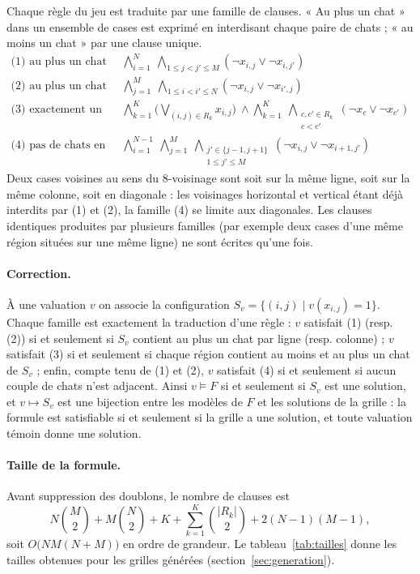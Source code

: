 \documentclass[11pt,a4paper]{article}
\newcommand{\x}[2]{x_{#1,#2}}
\begin{document}
Chaque règle du jeu est traduite par une famille de clauses. « Au plus un chat » dans un ensemble
de cases est exprimé en interdisant chaque paire de chats ; « au moins un chat » par une clause
unique.
\begin{align*}
\text{(1) au plus un chat par ligne :}\quad
  & \bigwedge_{i=1}^{N}\ \bigwedge_{1\le j<j'\le M} (\neg\x ij\vee\neg\x i{j'})\\
\text{(2) au plus un chat par colonne :}\quad
  & \bigwedge_{j=1}^{M}\ \bigwedge_{1\le i<i'\le N} (\neg\x ij\vee\neg\x {i'}j)\\
\text{(3) exactement un chat par région :}\quad
  & \bigwedge_{k=1}^{K}\Big(\bigvee_{(i,j)\in R_k}\x ij\Big)\ \wedge
    \bigwedge_{k=1}^{K}\ \bigwedge_{\substack{c,c'\in R_k\\ c<c'}} (\neg x_c\vee\neg x_{c'})\\
\text{(4) pas de chats en diagonale :}\quad
  & \bigwedge_{i=1}^{N-1}\ \bigwedge_{j=1}^{M}\ \bigwedge_{\substack{j'\in\{j-1,j+1\}\\1\le j'\le M}}
    (\neg\x ij\vee\neg\x{i+1}{j'})
\end{align*}
Deux cases voisines au sens du 8-voisinage sont soit sur la même ligne, soit sur la même colonne,
soit en diagonale : les voisinages horizontal et vertical étant déjà interdits par (1) et (2),
la famille (4) se limite aux diagonales. Les clauses identiques produites par plusieurs familles
(par exemple deux cases d'une même région situées sur une même ligne) ne sont écrites qu'une fois.

\paragraph{Correction.} À une valuation $v$ on associe la configuration
$S_v=\{(i,j)\mid v(\x ij)=1\}$. Chaque famille est exactement la traduction d'une règle :
$v$ satisfait (1) (resp. (2)) si et seulement si $S_v$ contient au plus un chat par ligne
(resp. colonne) ; $v$ satisfait (3) si et seulement si chaque région contient au moins et au plus
un chat de $S_v$ ; enfin, compte tenu de (1) et (2), $v$ satisfait (4) si et seulement si aucun
couple de chats n'est adjacent. Ainsi $v\models F$ si et seulement si $S_v$ est une solution, et
$v\mapsto S_v$ est une bijection entre les modèles de $F$ et les solutions de la grille : la
formule est satisfiable si et seulement si la grille a une solution, et toute valuation témoin
donne une solution.

\paragraph{Taille de la formule.} Avant suppression des doublons, le nombre de clauses est
\[
  N\binom M2 + M\binom N2 + K + \sum_{k=1}^{K}\binom{|R_k|}{2} + 2(N-1)(M-1),
\]
soit $O\big(NM(N+M)\big)$ en ordre de grandeur. Le tableau~\ref{tab:tailles} donne les tailles
obtenues pour les grilles générées (section~\ref{sec:generation}).
\end{document}
